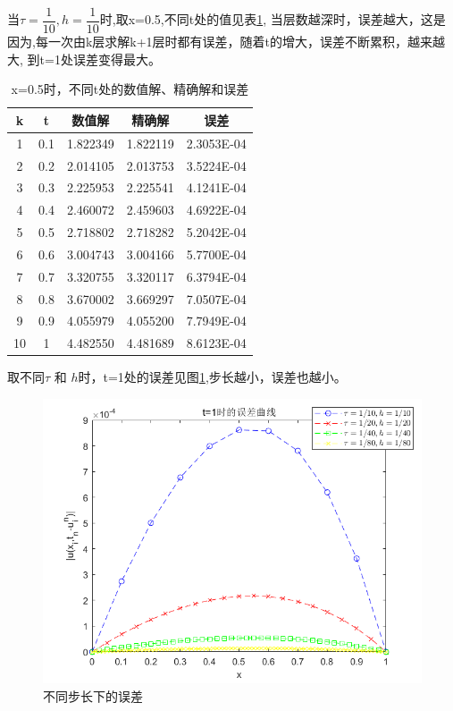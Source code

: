 \documentclass[withoutpreface,bwprint]{cumcmthesis} %
\begin{document}
当$\tau=\dfrac{1}{10},h=\dfrac{1}{10}$时,取x=0.5,不同t处的值见表\ref{tab:1},
当层数越深时，误差越大，这是因为,每一次由k层求解k+1层时都有误差，随着t的增大，误差不断累积，越来越大,
到t=1处误差变得最大。
\begin{table}[htbp]
	\centering
	\caption{x=0.5时，不同t处的数值解、精确解和误差}
	\begin{tabular}{ccccc}
		\toprule[1.5pt]
		k     & t     & 数值解   & 精确解   & 误差 \\
		\midrule[1pt]
		1     & 0.1   & 1.822349  & 1.822119  & 2.3053E-04 \\
		2     & 0.2   & 2.014105  & 2.013753  & 3.5224E-04 \\
		3     & 0.3   & 2.225953  & 2.225541  & 4.1241E-04 \\
		4     & 0.4   & 2.460072  & 2.459603  & 4.6922E-04 \\
		5     & 0.5   & 2.718802  & 2.718282  & 5.2042E-04 \\
		6     & 0.6   & 3.004743  & 3.004166  & 5.7700E-04 \\
		7     & 0.7   & 3.320755  & 3.320117  & 6.3794E-04 \\
		8     & 0.8   & 3.670002  & 3.669297  & 7.0507E-04 \\
		9     & 0.9   & 4.055979  & 4.055200  & 7.7949E-04 \\
		10    & 1     & 4.482550  & 4.481689  & 8.6123E-04 \\
		\bottomrule[1.5pt]
	\end{tabular}%
	\label{tab:1}%
\end{table}%


取不同$\tau$ 和 $h$时，t=1处的误差见图\ref{fig:f2},步长越小，误差也越小。
\begin{figure}
	\centering
	\includegraphics[width=0.7\linewidth]{figures/f2}
	\caption{不同步长下的误差}
	\label{fig:f2}
\end{figure}
\end{document}
